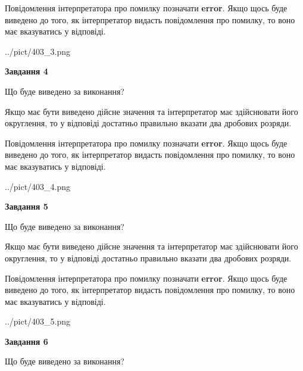 \documentclass[12pt, ukrainian]{article}
\begin{document}
{\begin {Large}
Повідомлення інтерпретатора про помилку позначати \textbf{error}.
Якщо щось буде виведено до того, як інтерпретатор видасть повідомлення про помилку, 
то воно має вказуватись у відповіді. \par

\begin{center}
	{../pict/403_3.png}
\end{center}
\newpage

{\begin {center}\textbf{Завдання 4}\end {center}}\par
Що буде виведено за виконання? \par

Якщо має бути виведено дійсне значення та інтерпретатор має здійснювати його округлення, 
то у відповіді достатньо правильно вказати два дробових розряди.

Повідомлення інтерпретатора про помилку позначати \textbf{error}.
Якщо щось буде виведено до того, як інтерпретатор видасть повідомлення про помилку, 
то воно має вказуватись у відповіді. \par

\begin{center}
	{../pict/403_4.png}
\end{center}
\newpage

{\begin {center}\textbf{Завдання 5}\end {center}}\par
Що буде виведено за виконання? \par

Якщо має бути виведено дійсне значення та інтерпретатор має здійснювати його округлення, 
то у відповіді достатньо правильно вказати два дробових розряди.

Повідомлення інтерпретатора про помилку позначати \textbf{error}.
Якщо щось буде виведено до того, як інтерпретатор видасть повідомлення про помилку, 
то воно має вказуватись у відповіді. \par

\begin{center}
	{../pict/403_5.png}
\end{center}
\newpage

{\begin {center}\textbf{Завдання 6}\end {center}}\par
Що буде виведено за виконання? \par


\end{Large}}
\end{document}
